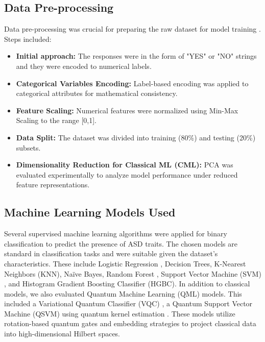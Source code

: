 \documentclass[runningheads]{llncs}
\begin{document}
\subsection{Data Pre-processing}

Data pre-processing was crucial for preparing the raw dataset for model training \cite{kotsiantis2006}. Steps included:
\begin{itemize}
    \item \textbf{Initial approach:} The responses were in the form of "YES" or "NO" strings and they were encoded to numerical labels.
    \item \textbf{Categorical Variables Encoding:} Label-based encoding was applied to categorical attributes for mathematical consistency.
    \item \textbf{Feature Scaling:} Numerical features were normalized using Min-Max Scaling to the range [0,1].
    \item \textbf{Data Split:} The dataset was divided into training (80\%) and testing (20\%) subsets.
    \item \textbf{Dimensionality Reduction for Classical ML (CML):} PCA was evaluated experimentally to analyze model performance under reduced feature representations.
\end{itemize}

\subsection{Machine Learning Models Used}\label{sec3.4}
\vspace{-1em}

Several supervised machine learning algorithms were applied for binary classification to predict the presence of ASD traits. 
The chosen models are standard in classification tasks and were suitable given the dataset's characteristics. 
These include Logistic Regression \cite{hosmer2000}, Decision Trees, K-Nearest Neighbors (KNN), 
Na\"{i}ve Bayes, Random Forest \cite{breiman2001}, Support Vector Machine (SVM) \cite{hearst1998}, and 
Histogram Gradient Boosting Classifier (HGBC).
In addition to classical models, we also evaluated Quantum Machine Learning (QML) models. This included a Variational Quantum Classifier (VQC)
\cite{schuld2020}, a Quantum Support Vector Machine (QSVM) using quantum kernel estimation \cite{havlivcek2019}. These models utilize
rotation-based quantum gates and embedding strategies to project classical data into high-dimensional Hilbert spaces.
\end{document}
